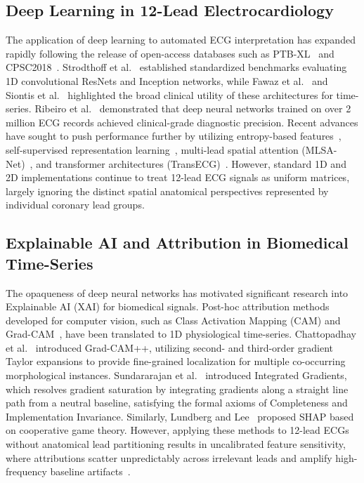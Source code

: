 \documentclass[12pt]{elsarticle}
\begin{document}
\subsection{Deep Learning in 12-Lead Electrocardiology}
The application of deep learning to automated ECG interpretation has expanded rapidly following the release of open-access databases such as PTB-XL~\cite{wagner2020ptb} and CPSC2018~\cite{liu2018open}. Strodthoff et al.~\cite{strodthoff2020deep} established standardized benchmarks evaluating 1D convolutional ResNets and Inception networks, while Fawaz et al.~\cite{fawaz2019deep} and Siontis et al.~\cite{siontis2021artificial} highlighted the broad clinical utility of these architectures for time-series. Ribeiro et al.~\cite{ribeiro2020automatic} demonstrated that deep neural networks trained on over 2 million ECG records achieved clinical-grade diagnostic precision. Recent advances have sought to push performance further by utilizing entropy-based features~\cite{smigiel2021ecg}, self-supervised representation learning~\cite{mehari2022self}, multi-lead spatial attention (MLSA-Net)~\cite{mehari2023mlsa}, and transformer architectures (TransECG)~\cite{niu2023transecg, che2021constrained}. However, standard 1D and 2D implementations continue to treat 12-lead ECG signals as uniform matrices, largely ignoring the distinct spatial anatomical perspectives represented by individual coronary lead groups.

\subsection{Explainable AI and Attribution in Biomedical Time-Series}
The opaqueness of deep neural networks has motivated significant research into Explainable AI (XAI) for biomedical signals. Post-hoc attribution methods developed for computer vision, such as Class Activation Mapping (CAM) and Grad-CAM~\cite{selvaraju2017grad}, have been translated to 1D physiological time-series. Chattopadhay et al.~\cite{chattopadhay2018grad} introduced Grad-CAM++, utilizing second- and third-order gradient Taylor expansions to provide fine-grained localization for multiple co-occurring morphological instances. Sundararajan et al.~\cite{sundararajan2017axiomatic} introduced Integrated Gradients, which resolves gradient saturation by integrating gradients along a straight line path from a neutral baseline, satisfying the formal axioms of Completeness and Implementation Invariance. Similarly, Lundberg and Lee~\cite{lundberg2017unified} proposed SHAP based on cooperative game theory. However, applying these methods to 12-lead ECGs without anatomical lead partitioning results in uncalibrated feature sensitivity, where attributions scatter unpredictably across irrelevant leads and amplify high-frequency baseline artifacts~\cite{ismail2020benchmarking, tonekaboni2020went}.
\end{document}
